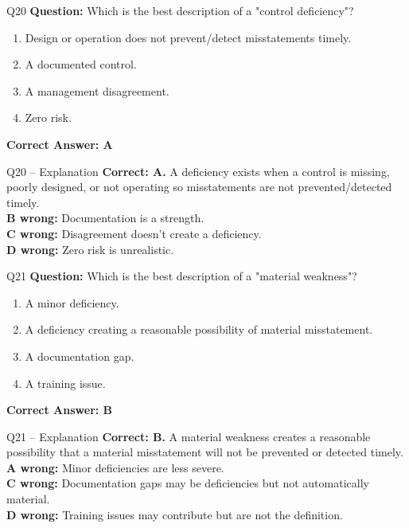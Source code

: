 \documentclass[aspectratio=169,10pt]{beamer}
\begin{document}
	\begin{frame}[t]{Q20}
		\small
		\textbf{Question:} Which is the best description of a "control deficiency"?
		\begin{enumerate}[label=\Alph*.,itemsep=1pt,topsep=2pt]
			\item Design or operation does not prevent/detect misstatements timely.
			\item A documented control.
			\item A management disagreement.
			\item Zero risk.
		\end{enumerate}
		\vspace{4pt}
		\textbf{Correct Answer: A}
	\end{frame}
	
	\begin{frame}[t]{Q20 -- Explanation}
		\small
		\textbf{Correct: A.} A deficiency exists when a control is missing, poorly designed, or not operating so misstatements are not prevented/detected timely. \\[4pt]
		\textbf{B wrong:} Documentation is a strength. \\[2pt]
		\textbf{C wrong:} Disagreement doesn't create a deficiency. \\[2pt]
		\textbf{D wrong:} Zero risk is unrealistic.
	\end{frame}
	
	\begin{frame}[t]{Q21}
		\small
		\textbf{Question:} Which is the best description of a "material weakness"?
		\begin{enumerate}[label=\Alph*.,itemsep=1pt,topsep=2pt]
			\item A minor deficiency.
			\item A deficiency creating a reasonable possibility of material misstatement.
			\item A documentation gap.
			\item A training issue.
		\end{enumerate}
		\vspace{4pt}
		\textbf{Correct Answer: B}
	\end{frame}
	
	\begin{frame}[t]{Q21 -- Explanation}
		\small
		\textbf{Correct: B.} A material weakness creates a reasonable possibility that a material misstatement will not be prevented or detected timely. \\[4pt]
		\textbf{A wrong:} Minor deficiencies are less severe. \\[2pt]
		\textbf{C wrong:} Documentation gaps may be deficiencies but not automatically material. \\[2pt]
		\textbf{D wrong:} Training issues may contribute but are not the definition.
	\end{frame}
	
\end{document}
